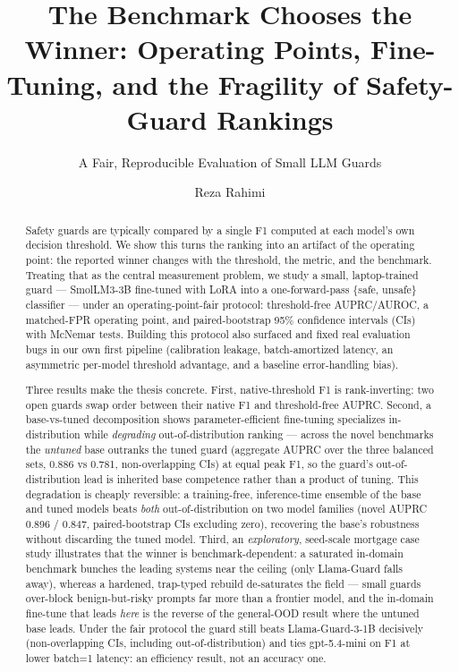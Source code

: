 \documentclass[sigconf,nonacm]{acmart}
\begin{document}
\title{The Benchmark Chooses the Winner: Operating Points, Fine-Tuning, and the Fragility of Safety-Guard Rankings}
\subtitle{A Fair, Reproducible Evaluation of Small LLM Guards}

\author{Reza Rahimi}

\begin{abstract}
Safety guards are typically compared by a single F1 computed at each model's own decision threshold. We show this turns the ranking into an artifact of the operating point: the reported winner changes with the threshold, the metric, and the benchmark. Treating that as the central measurement problem, we study a small, laptop-trained guard --- SmolLM3-3B fine-tuned with LoRA into a one-forward-pass \{safe, unsafe\} classifier --- under an operating-point-fair protocol: threshold-free AUPRC/AUROC, a matched-FPR operating point, and paired-bootstrap 95\% confidence intervals (CIs) with McNemar tests. Building this protocol also surfaced and fixed real evaluation bugs in our own first pipeline (calibration leakage, batch-amortized latency, an asymmetric per-model threshold advantage, and a baseline error-handling bias).

Three results make the thesis concrete. First, native-threshold F1 is rank-inverting: two open guards swap order between their native F1 and threshold-free AUPRC. Second, a base-vs-tuned decomposition shows parameter-efficient fine-tuning specializes in-distribution while \emph{degrading} out-of-distribution ranking --- across the novel benchmarks the \emph{untuned} base outranks the tuned guard (aggregate AUPRC over the three balanced sets, 0.886 vs 0.781, non-overlapping CIs) at equal peak F1, so the guard's out-of-distribution lead is inherited base competence rather than a product of tuning. This degradation is cheaply reversible: a training-free, inference-time ensemble of the base and tuned models beats \emph{both} out-of-distribution on two model families (novel AUPRC 0.896 / 0.847, paired-bootstrap CIs excluding zero), recovering the base's robustness without discarding the tuned model. Third, an \emph{exploratory}, seed-scale mortgage case study illustrates that the winner is benchmark-dependent: a saturated in-domain benchmark bunches the leading systems near the ceiling (only Llama-Guard falls away), whereas a hardened, trap-typed rebuild de-saturates the field --- small guards over-block benign-but-risky prompts far more than a frontier model, and the in-domain fine-tune that leads \emph{here} is the reverse of the general-OOD result where the untuned base leads. Under the fair protocol the guard still beats Llama-Guard-3-1B decisively (non-overlapping CIs, including out-of-distribution) and ties gpt-5.4-mini on F1 at lower batch=1 latency: an efficiency result, not an accuracy one.
\end{abstract}
\end{document}
